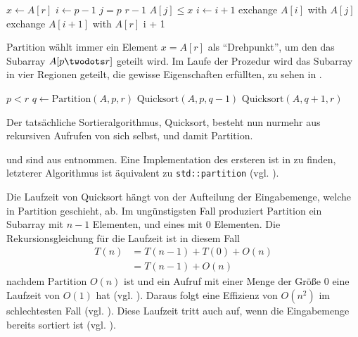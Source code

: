 \begin{codebox}
    \li $x \gets A[r]$
    \li $i \gets p - 1$
    \li \For $j = p$ \To $r - 1$
    \li     \Do
                \If $A[j] \leq x$
    \li             \Then
                        $i \gets i + 1$
    \li                 exchange $A[i]$ with $A[j]$
                    \End
            \End
    \li exchange $A[i + 1]$ with $A[r]$
    \li \Return i + 1
\end{codebox}

$\text{Partition}$ wählt immer ein Element $x = A[r]$ als \enquote{Drehpunkt}, um den das Subarray $A[p \twodots r]$ geteilt wird. Im Laufe der Prozedur wird das Subarray in vier Regionen geteilt, die gewisse Eigenschaften erfüllten, zu sehen in .



\begin{codebox}
    \li \If $p < r$
    \li     \Then
                $q \gets \text{Partition}(A, p, r)$
    \li         $\text{Quicksort}(A, p, q - 1)$
    \li         $\text{Quicksort}(A, q + 1, r)$
            \End
\end{codebox}

Der tatsächliche Sortieralgorithmus, Quicksort, besteht nun nurmehr aus rekursiven Aufrufen von sich selbst, und damit Partition.

 und  sind aus \cite[171]{clrs2001} entnommen. Eine Implementation des ersteren ist in  zu finden, letzterer Algorithmus ist äquivalent zu \lstinline{std::partition} (vgl. \cite[927]{ISO-C++17}).

Die Laufzeit von Quicksort hängt von der Aufteilung der Eingabemenge, welche in $\text{Partition}$ geschieht, ab. Im ungünstigsten Fall produziert $\text{Partition}$ ein Subarray mit $n - 1$ Elementen, und eines mit $0$ Elementen. Die Rekursionsgleichung für die Laufzeit ist in diesem Fall
\begin{equation}\label{eq:quicks-efficiency}
\begin{split}
    T(n) &= T(n - 1) + T(0) + O(n)\\
    &= T(n - 1) + O(n)
\end{split}
\end{equation}
nachdem $\text{Partition}$ $O(n)$ ist und ein Aufruf mit einer Menge der Größe $0$ eine Laufzeit von $O(1)$ hat (vgl. \cite[175]{clrs2001}). Daraus folgt eine Effizienz von $O(n^2)$ im schlechtesten Fall (vgl. \cite[49]{rp2013}). Diese Laufzeit tritt auch auf, wenn die Eingabemenge bereits sortiert ist (vgl. \cite[175]{clrs2001}).

